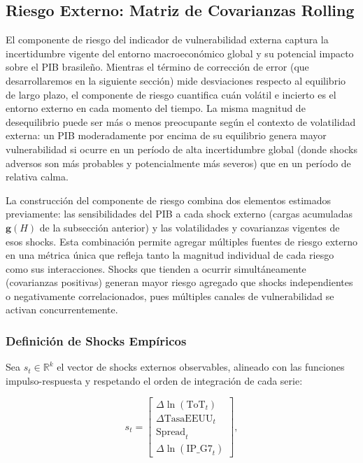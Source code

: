 \documentclass[3p,11pt,draft,natbib=false]{elsarticle}
\newcommand{\vect}[1]{\boldsymbol{#1}}
\begin{document}
\subsection{Riesgo Externo: Matriz de Covarianzas Rolling}
\label{sec:riesgo}

El componente de riesgo del indicador de vulnerabilidad externa captura la incertidumbre vigente del entorno macroeconómico global y su potencial impacto sobre el PIB brasileño. Mientras el término de corrección de error (que desarrollaremos en la siguiente sección) mide desviaciones respecto al equilibrio de largo plazo, el componente de riesgo cuantifica cuán volátil e incierto es el entorno externo en cada momento del tiempo. La misma magnitud de desequilibrio puede ser más o menos preocupante según el contexto de volatilidad externa: un PIB moderadamente por encima de su equilibrio genera mayor vulnerabilidad si ocurre en un período de alta incertidumbre global (donde shocks adversos son más probables y potencialmente más severos) que en un período de relativa calma.

La construcción del componente de riesgo combina dos elementos estimados previamente: las sensibilidades del PIB a cada shock externo (cargas acumuladas $\vect{g}(H)$ de la subsección anterior) y las volatilidades y covarianzas vigentes de esos shocks. Esta combinación permite agregar múltiples fuentes de riesgo externo en una métrica única que refleja tanto la magnitud individual de cada riesgo como sus interacciones. Shocks que tienden a ocurrir simultáneamente (covarianzas positivas) generan mayor riesgo agregado que shocks independientes o negativamente correlacionados, pues múltiples canales de vulnerabilidad se activan concurrentemente.

\subsubsection{Definición de Shocks Empíricos}

Sea $s_t \in \mathbb{R}^{k}$ el vector de shocks externos observables, alineado con las funciones impulso-respuesta y respetando el orden de integración de cada serie:

\begin{equation}
s_t = \begin{bmatrix}
\Delta \ln(\text{ToT}_t) \\
\Delta \text{TasaEEUU}_t \\
\text{Spread}_t \\
\Delta \ln(\text{IP\_G7}_t)
\end{bmatrix},
\label{eq:shocks_vector}
\end{equation}
\end{document}
